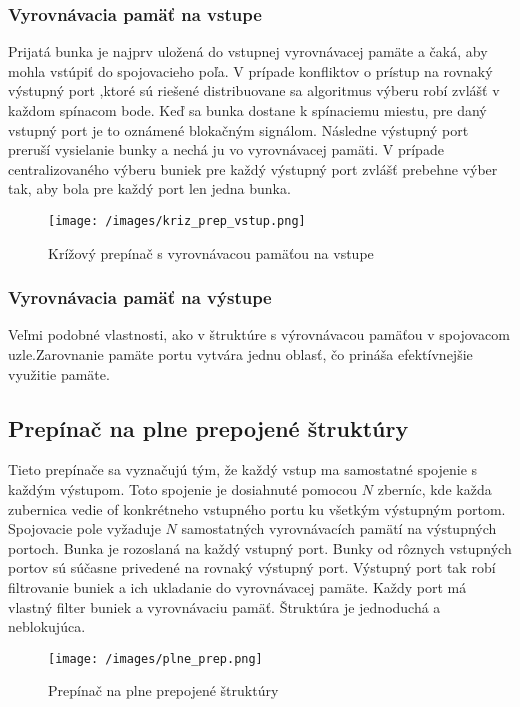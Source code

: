 \subsubsection{Vyrovnávacia pamäť na vstupe}
Prijatá bunka je najprv uložená do vstupnej vyrovnávacej pamäte a čaká, aby mohla vstúpiť do spojovacieho poľa. V prípade konfliktov o prístup na rovnaký výstupný port ,ktoré sú riešené distribuovane sa algoritmus výberu robí zvlášť v každom spínacom bode. Keď sa bunka dostane k spínaciemu miestu, pre daný vstupný port je to oznámené blokačným signálom. Následne výstupný port preruší vysielanie bunky a nechá ju vo vyrovnávacej pamäti. V prípade centralizovaného výberu buniek pre každý výstupný port zvlášť prebehne výber tak, aby bola pre každý port len jedna bunka.

\begin{figure}[ht]
\centering
  \begin{center}
    \texttt{[image: /images/kriz\_prep\_vstup.png]}
  \end{center}
  \caption[Krížový prepínač s vyrovnávacou pamäťou na vstupe]{Krížový prepínač s vyrovnávacou pamäťou na vstupe}
\end{figure}

\subsubsection{Vyrovnávacia pamäť na výstupe}
Veľmi podobné vlastnosti, ako v štruktúre s výrovnávacou pamäťou v spojovacom uzle.Zarovnanie pamäte portu vytvára jednu oblasť, čo prináša efektívnejšie využitie pamäte.


\subsection{Prepínač na plne prepojené štruktúry}
Tieto prepínače sa vyznačujú tým, že každý vstup ma samostatné spojenie s každým výstupom. Toto spojenie je dosiahnuté pomocou $N$ zberníc, kde každa zubernica vedie of konkrétneho vstupného portu ku všetkým výstupným portom. Spojovacie pole vyžaduje $N$ samostatných vyrovnávacích pamätí na výstupných portoch. Bunka je rozoslaná na každý vstupný port. Bunky od rôznych vstupných portov sú súčasne privedené na rovnaký výstupný port. Výstupný port tak robí filtrovanie buniek a ich ukladanie do vyrovnávacej pamäte. Každy port má vlastný filter buniek a vyrovnávaciu pamäť. Štruktúra je jednoduchá a neblokujúca.

\begin{figure}[ht]
\centering
  \begin{center}
    \texttt{[image: /images/plne\_prep.png]}
  \end{center}
  \caption[Prepínač na plne prepojené štruktúry]{Prepínač na plne prepojené štruktúry}
\end{figure}

